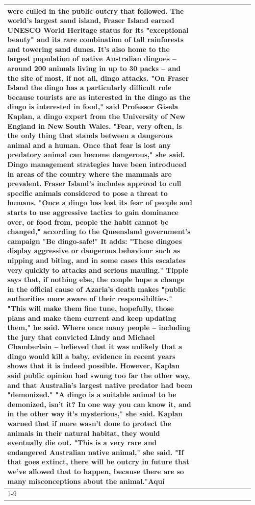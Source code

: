 \begin{table}[H]
\begin{tabular}{lllrlllll}
were culled in the public outcry that followed. The world's largest sand island, Fraser Island earned UNESCO World Heritage status for its "exceptional beauty" and its rare combination of tall rainforests and towering sand dunes. It's also home to the largest population of native Australian dingoes -- around 200 animals living in up to 30 packs -- and the site of most, if not all, dingo attacks. "On Fraser Island the dingo has a particularly difficult role because tourists are as interested in the dingo as the dingo is interested in food," said Professor Gisela Kaplan, a dingo expert from the University of New England in New South Wales. "Fear, very often, is the only thing that stands between a dangerous animal and a human. Once that fear is lost any predatory animal can become dangerous," she said. Dingo management strategies have been introduced in areas of the country where the mammals are prevalent. Fraser Island's includes approval to cull specific animals considered to pose a threat to humans. "Once a dingo has lost its fear of people and starts to use aggressive tactics to gain dominance over, or food from, people the habit cannot be changed," according to the Queensland government's campaign "Be dingo-safe!" It adds: "These dingoes display aggressive or dangerous behaviour such as nipping and biting, and in some cases this escalates very quickly to attacks and serious mauling." Tipple says that, if nothing else, the couple hope a change in the official cause of Azaria's death makes "public authorities more aware of their responsibilties." "This will make them fine tune, hopefully, those plans and make them current and keep updating them," he said. Where once many people -- including the jury that convicted Lindy and Michael Chamberlain -- believed that it was unlikely that a dingo would kill a baby, evidence in recent years shows that it is indeed possible. However, Kaplan said public opinion had swung too far the other way, and that Australia's largest native predator had been "demonized." "A dingo is a suitable animal to be demonized, isn't it? In one way you can know it, and in the other way it's mysterious," she said. Kaplan warned that if more wasn't done to protect the animals in their natural habitat, they would eventually die out. "This is a very rare and endangered Australian native animal," she said. "If that goes extinct, there will be outcry in future that we've allowed that to happen, because there are so many misconceptions about the animal."Aquí \\
\cline{1-9}

\end{tabular}
\end{table}
